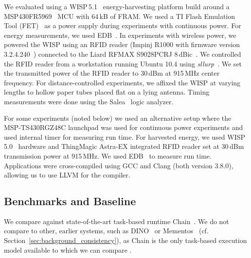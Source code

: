 
We evaluated \sys using a WISP\,5.1~\cite{wisp5,wisp} energy-harvesting
platform build around a MSP430FR5969~\cite{wolverine} MCU with 64\,kB of FRAM.
We used a TI Flash Emulation Tool (FET)~\cite{fet} as a power supply during
experiments with continuous power. For energy measurements, we used
EDB~\cite{edb}. In experiments with wireless power, we powered the WISP using
an RFID reader (Impinj R1000 with firmware version
3.2.4.240~\cite{r1000_data_sheet}) connected to the Liard RFMAX S9028PCRJ
8\,dBic~\cite{atlas2015}. We controlled the RFID reader from a workstation
running Ubuntu 10.4 using \emph{sllurp}~\cite{sllrp_github}. We set the
transmitted power of the RFID reader to 30\,dBm at 915\,MHz center frequency.
For distance-controlled experiments, we affixed the WISP at varying lengths to
hollow paper tubes placed flat on a lying antenna. Timing measurements
were done using the Salea~\cite{saleae} logic analyzer.

For some experiments (noted below) we used an alternative setup where the
MSP-TS430RGZ48C launchpad was used for continuous power experiments and used
internal timer for measuring run time. For harvested energy, we used
WISP\,5.0~\cite{wisp5,wisp} hardware and ThingMagic Astra-EX integrated RFID
reader set at 30\,dBm transmission power at 915\,MHz. We used EDB~\cite{edb}
to measure run time. Applications were cross-compiled using GCC and Clang (both version 3.8.0), allowing us to use LLVM for the \sys compiler. 

\subsection{Benchmarks and Baseline}
\label{sec:results_software}

We compare \sys against state-of-the-art task-based runtime Chain~\cite{chain}.
We do not compare \sys to other, earlier systems, such as DINO~\cite{dino} or
Mementos~\cite{mementos} (cf. Section~\ref{sec:background_consistency}), as
Chain is the only task-based execution model available to which we can compare
\sys. 

